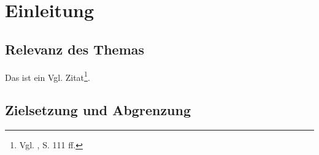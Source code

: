 \section{Einleitung}
\subsection{Relevanz des Themas}
Das ist ein Vgl. Zitat\footnote{Vgl. \cite{Balzert2008}, S. 111 ff.}.
%

\subsection{Zielsetzung und Abgrenzung}


